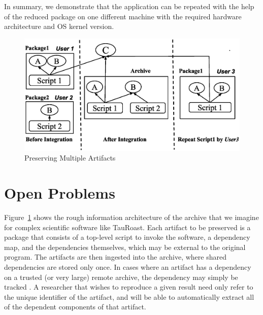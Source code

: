 \documentclass{sig-alternate}
\begin{document}
In summary, we demonstrate that the application can be repeated with the help of the reduced package on one different machine with the required hardware architecture and OS kernel version.

\begin{figure}
\centering
\includegraphics[width=1\columnwidth]{preservation-integration.eps}
\caption{Preserving Multiple Artifacts}
\label{fig:Preservation integration}
\end{figure}

\section{Open Problems}

Figure~\ref{fig:Preservation integration} shows the rough information
architecture of the archive that we imagine for complex
scientific software like TauRoast.
Each artifact to be preserved is a package that consists of a top-level
script to invoke the software, a dependency map, and the dependencies
themselves, which may be external to the original program.  The artifacts
are then ingested into the archive, where shared dependencies are stored
only once.  In cases where an artifact has a dependency on a trusted
(or very large) remote archive, the dependency may simply be tracked
. A researcher that wishes to reproduce a given
result need only refer to the unique identifier of the artifact, and will
be able to automatically extract all of the dependent components of
that artifact.
\end{document}
